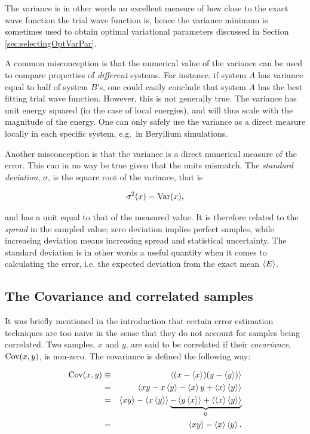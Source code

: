 The variance is in other words an excellent measure of how close to the exact wave function the trial wave function is, hence the variance minimum is sometimes used to obtain optimal variational parameters discussed in Section \ref{sec:selectingOptVarPar}. 

A common misconception is that the numerical value of the variance can be used to compare properties of \textit{different} systems. For instance, if system $A$ has variance equal to half of system $B$'s, one could easily conclude that system $A$ has the best fitting trial wave function. However, this is not generally true. The variance has unit energy squared (in the case of local energies), and will thus scale with the magnitude of the energy. One can only safely use the variance as a direct measure locally in each specific system, e.g.~in Beryllium simulations.

Another misconception is that the variance is a direct numerical measure of the error. This can in no way be true given that the units mismatch. The \textit{standard deviation}, $\sigma$, is the square root of the variance, that is

\begin{equation}
\label{eq:stdNaive}
 \sigma^2(x) = \mathrm{Var}(x),
\end{equation}


and has a unit equal to that of the measured value. It is therefore related to the \textit{spread} in the sampled value; zero deviation implies perfect samples, while increasing deviation means increasing spread and statistical uncertainty. The standard deviation is in other words a useful quantity when it comes to calculating the error, i.e. the expected deviation from the exact mean $\left< E \right>$.

\subsection{The Covariance and correlated samples}

It was briefly mentioned in the introduction that certain error estimation techniques are too naive in the sense that they do not account for samples being correlated. Two samples, $x$ and $y$, are said to be correlated if their \textit{covariance}, $\mathrm{Cov}(x, y)$, is non-zero. The covariance is defined the following way:

\begin{eqnarray}
\label{eq:covariance}
 \mathrm{Cov}(x, y) &\equiv& \left< (x - \left< x \right>)(y - \left< y \right>) \right> \nonumber\\
            &=& \left< xy - x\left< y \right> - \left< x \right>y + \left< x \right>\left< y \right> \right> \nonumber\\
            &=& \left< xy \right> - \left< x\left< y \right> \right> \underbrace{-\left< y\left< x \right> \right> + \left< \left< x \right>\left< y \right> \right>}_{0} \nonumber\\
            &=& \left< xy \right> - \left< x \right>\left< y \right>.
\end{eqnarray}

